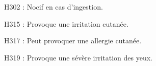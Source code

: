 \documentclass[12pt,a4paper]{article}
\begin{document}
\begin{multicols}{2}
\begin{doc}
\footnotesize
\noindent
H302 : Nocif en cas d'ingestion.

\noindent
H315 : Provoque une irritation cutanée.

\noindent
H317 : Peut provoquer une allergie cutanée.

\noindent
H319 : Provoque une sévère irritation des yeux.
\end{doc}

\end{multicols}
\end{document}
